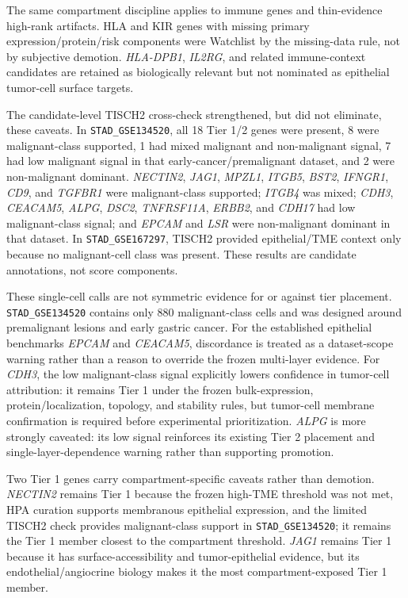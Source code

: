 \documentclass[twocolumn]{article}
\begin{document}
The same compartment discipline applies to immune genes and thin-evidence high-rank artifacts. HLA and KIR genes with missing primary expression/\allowbreak{}protein/\allowbreak{}risk components were Watchlist by the missing-data rule, not by subjective demotion. \textit{HLA-DPB1}, \textit{IL2RG}, and related immune-context candidates are retained as biologically relevant but not nominated as epithelial tumor-cell surface targets.

The candidate-level TISCH2 cross-check strengthened, but did not eliminate, these caveats. In \texttt{STAD\_GSE134520}, all 18 Tier 1/\allowbreak{}2 genes were present, 8 were malignant-class supported, 1 had mixed malignant and non-malignant signal, 7 had low malignant signal in that early-cancer/\allowbreak{}premalignant dataset, and 2 were non-malignant dominant. \textit{NECTIN2}, \textit{JAG1}, \textit{MPZL1}, \textit{ITGB5}, \textit{BST2}, \textit{IFNGR1}, \textit{CD9}, and \textit{TGFBR1} were malignant-class supported; \textit{ITGB4} was mixed; \textit{CDH3}, \textit{CEACAM5}, \textit{ALPG}, \textit{DSC2}, \textit{TNFRSF11A}, \textit{ERBB2}, and \textit{CDH17} had low malignant-class signal; and \textit{EPCAM} and \textit{LSR} were non-malignant dominant in that dataset. In \texttt{STAD\_GSE167297}, TISCH2 provided epithelial/\allowbreak{}TME context only because no malignant-cell class was present. These results are candidate annotations, not score components.

These single-cell calls are not symmetric evidence for or against tier placement. \texttt{STAD\_GSE134520} contains only 880 malignant-class cells and was designed around premalignant lesions and early gastric cancer. For the established epithelial benchmarks \textit{EPCAM} and \textit{CEACAM5}, discordance is treated as a dataset-scope warning rather than a reason to override the frozen multi-layer evidence. For \textit{CDH3}, the low malignant-class signal explicitly lowers confidence in tumor-cell attribution: it remains Tier 1 under the frozen bulk-expression, protein/\allowbreak{}localization, topology, and stability rules, but tumor-cell membrane confirmation is required before experimental prioritization. \textit{ALPG} is more strongly caveated: its low signal reinforces its existing Tier 2 placement and single-layer-dependence warning rather than supporting promotion.

Two Tier 1 genes carry compartment-specific caveats rather than demotion. \textit{NECTIN2} remains Tier 1 because the frozen high-TME threshold was not met, HPA curation supports membranous epithelial expression, and the limited TISCH2 check provides malignant-class support in \texttt{STAD\_GSE134520}; it remains the Tier 1 member closest to the compartment threshold. \textit{JAG1} remains Tier 1 because it has surface-accessibility and tumor-epithelial evidence, but its endothelial/\allowbreak{}angiocrine biology makes it the most compartment-exposed Tier 1 member.
\end{document}
